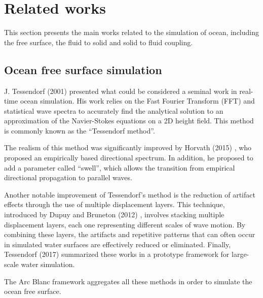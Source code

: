 \documentclass[final]{jcgt}
\def\Framework{The Arc Blanc framework\xspace}
\begin{document}
\section{Related works}
\label{sec:relatedwork}
This section presents the main works related to the simulation of ocean, including the free surface, the fluid to solid and solid to fluid coupling.

\subsection{Ocean free surface simulation}
\label{subsubsec:oceanFreeSurfaceSim}
J. Tessendorf (2001) \cite{tessendorfSimulating2001} presented what could be considered a seminal work in real-time ocean simulation. His work relies on the Fast Fourier Transform (FFT) and statistical wave spectra to accurately find the analytical solution to an approximation of the Navier-Stokes equations on a 2D height field. This method is commonly known as the “Tessendorf method”.

The realism of this method was significantly improved by Horvath (2015) \cite{horvathEmpiricalDirectionalWave2015}, who proposed an empirically based directional spectrum.
In addition, he proposed to add a parameter called “swell”, which allows the transition from empirical directional propagation to parallel waves.

Another notable improvement of Tessendorf's method is the reduction of artifact effects through the use of multiple displacement layers.
This technique, introduced by Dupuy and Bruneton (2012) \cite{dupuyRealtimeAnimationRendering2012}, involves stacking multiple displacement layers, each one representing different scales of wave motion.
By combining these layers, the artifacts and repetitive patterns that can often occur in simulated water surfaces are effectively reduced or eliminated.
Finally, Tessendorf (2017) \cite{tessendorfGilliganPrototypeFramework2017} summarized these works in a prototype framework for large-scale water simulation.

\Framework aggregates all these methods in order to simulate the ocean free surface.
\end{document}
